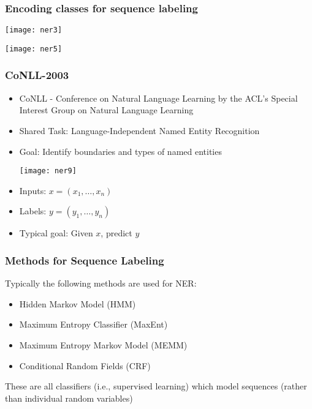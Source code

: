 \begin{frame}[fragile]\frametitle{Encoding classes for sequence labeling}

\begin{center}
\texttt{[image: ner3]}

\texttt{[image: ner5]}
\end{center}
\end{frame}

\begin{frame}[fragile]\frametitle{CoNLL-2003}
  \begin{itemize}
  \item CoNLL - Conference on Natural Language Learning by the ACL's Special Interest Group on Natural Language Learning
  \item Shared Task: Language-Independent Named Entity Recognition
  \item Goal: Identify boundaries and types of named entities
\begin{center}
\texttt{[image: ner9]}
\end{center}
\item Inputs: $x = (x_1,\ldots, x_n)$
\item Labels: $y = (y_1,\ldots, y_n)$
\item Typical goal: Given $x$, predict $y$

  \end{itemize}
\end{frame}

\begin{frame}[fragile]\frametitle{Methods for Sequence Labeling}
Typically the following methods are used for NER:
  \begin{itemize}
  \item Hidden Markov Model (HMM)
  \item Maximum Entropy Classifier (MaxEnt)
  \item Maximum Entropy Markov Model (MEMM)
  \item Conditional Random Fields (CRF)
  \end{itemize}
These are all classifiers (i.e., supervised learning) which model sequences (rather than individual random variables)
\end{frame}


